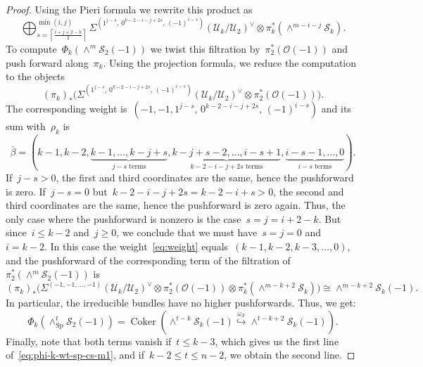 \documentclass[a4paper]{article}
\newcommand{\Sp}{\mathrm{Sp}}
\newcommand{\cU}{\mathcal{U}}
\newcommand{\cS}{\mathcal{S}}
\newcommand{\cO}{\mathcal{O}}
\theoremstyle{remark}
\theoremstyle{definition}
\begin{document}
\begin{proof}
Using the Pieri formula we rewrite this product as
\begin{equation*}
\bigoplus_{s = \left\lceil\! \frac{i+j+2-k}{2} \!\right\rceil}^{\min(i,j)} 
\Sigma^{(1^{j-s},\,0^{k-2-i-j+2s},\,(-1)^{i-s})} (\cU_k/\cU_2)^\vee \otimes \pi_k^*(\wedge^{m-i-j} \cS_k).
\end{equation*}
To compute~\(\Phi_k(\wedge^m \cS_2(-1))\) we twist this filtration by~\(\pi_2^*(\cO(-1))\) and push forward along~\(\pi_k\).
Using the projection formula, we reduce the computation to the objects
\begin{equation*}
(\pi_k)_*\Big(\Sigma^{(1^{j-s},\,0^{k-2-i-j+2s},\,(-1)^{i-s})} (\cU_k/\cU_2)^\vee \otimes \pi_2^*(\cO(-1))\Big).
\end{equation*}
The corresponding weight is~\((-1,-1,1^{j-s},\,0^{k-2-i-j+2s},\,(-1)^{i-s})\)
and its sum with~\(\rho_k\) is 
\begin{equation}
\label{eq:weight}
\bar\beta = 
(k-1,k-2,
\underbrace{k-1,\dots,k-j+s}_{\text{\(j-s\) terms}}, 
\underbrace{k-j+s-2,\dots,i-s+1}_{\text{\(k-2-i-j+2s\) terms}},
\underbrace{i-s-1,\dots,0}_{\text{\(i-s\) terms}}).
\end{equation}
If~\(j - s > 0\), the first and third coordinates are the same, hence the pushforward is zero.
If~\(j - s = 0\) but~\(k-2-i-j+2s = k - 2 - i + s > 0\), the second and third coordinates are the same, hence the pushforward is zero again.
Thus, the only case where the pushforward is nonzero is the case~\(s = j = i + 2 - k\).
But since~\(i \le k - 2\) and~\(j \ge 0\), we conclude that we must have~\(s = j = 0\) and~\(i = k - 2\).
In this case the weight~\eqref{eq:weight} equals~\((k -1, k - 2, k - 3, \dots, 0)\),
and the pushforward of the corresponding term of the filtration of~\(\pi_2^*(\wedge^m \cS_2(-1))\) is 
\begin{equation*}
(\pi_k)_*\Big(\Sigma^{(-1,-1,\dots,-1)} (\cU_k/\cU_2)^\vee \otimes \pi_2^*(\cO(-1)) \otimes \pi_k^*(\wedge^{m - k + 2} \cS_k) \Big) 
\cong \wedge^{m-k+2} \cS_k(-1).
\end{equation*}
In particular, the irreducible bundles have no higher pushforwards.
Thus, %
we get:
\begin{equation*}
	\Phi_k(\wedge^t_\Sp \cS_2(-1)) = \operatorname{Coker}(\wedge^{t-k} \cS_k(-1) \overset{\omega_\cS}\hookrightarrow \wedge^{t-k+2} \cS_k(-1)).
\end{equation*}
Finally, note that both terms vanish
if~\(t \le k - 3\), 
which gives us the first line of~\eqref{eq:phi-k-wt-sp-cs-m1},
and if~\(k - 2 \le t \le n - 2\), we obtain the second line.
\end{proof}
\end{document}
